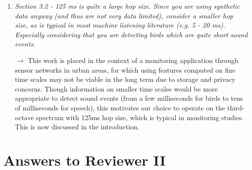 \documentclass[10pt]{article}
\begin{document}
\begin{enumerate}
\item \emph{Section 3.2 - 125 ms is quite a large hop size. Since you are using synthetic data anyway (and thus are not very data limited), consider a smaller hop size, as is typical in most machine listening literature (e.g. 5 - 20 ms). Especially considering that you are detecting birds which are quite short sound events.}

$\rightarrow$ This work is placed in the context of a monitoring application through sensor networks in urban areas, for which using features computed on fine time scales may not be viable in the long term due to storage and privacy concerns. Though information on smaller time scales would be more appropriate to detect sound events (from a few milliseconds for birds to tens of milliseconds for speech), this motivates our choice to operate on the third-octave spectrum with 125ms hop size, which is typical in monitoring studies. This is now discussed in the introduction.







\end{enumerate}

\section{Answers to Reviewer II}
\end{document}
